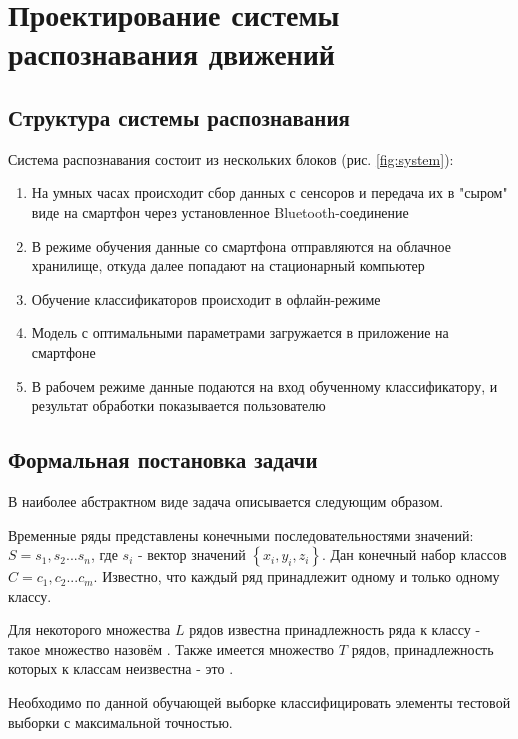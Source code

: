 \chapter{Проектирование системы распознавания движений}


\section{Структура системы распознавания}

Система распознавания состоит из нескольких блоков (рис. \ref{fig:system}):


\begin{enumerate}
\item На умных часах происходит сбор данных с сенсоров и передача их в "сыром" виде на смартфон через установленное Bluetooth-соединение
\item В режиме обучения данные со смартфона отправляются на облачное хранилище, откуда далее попадают на стационарный компьютер
\item Обучение классификаторов происходит в офлайн-режиме
\item Модель с оптимальными параметрами загружается в приложение на смартфоне
\item В рабочем режиме данные подаются на вход обученному классификатору, и результат обработки показывается пользователю
\end{enumerate}


\section{Формальная постановка задачи}

В наиболее абстрактном виде задача описывается следующим образом. 

Временные ряды представлены конечными последовательностями значений: $S=s_1,s_2...s_n$, где $s_i$ - вектор значений $\left\{x_i,y_i,z_i\right\}$. Дан конечный набор классов $C=c_1,c_2...c_m$. Известно, что каждый ряд принадлежит одному и только одному классу. 

Для некоторого множества $L$ рядов известна принадлежность ряда к классу - такое множество назовём . Также имеется множество $T$ рядов, принадлежность которых к классам неизвестна - это .

Необходимо по данной обучающей выборке классифицировать элементы тестовой выборки с максимальной точностью.

